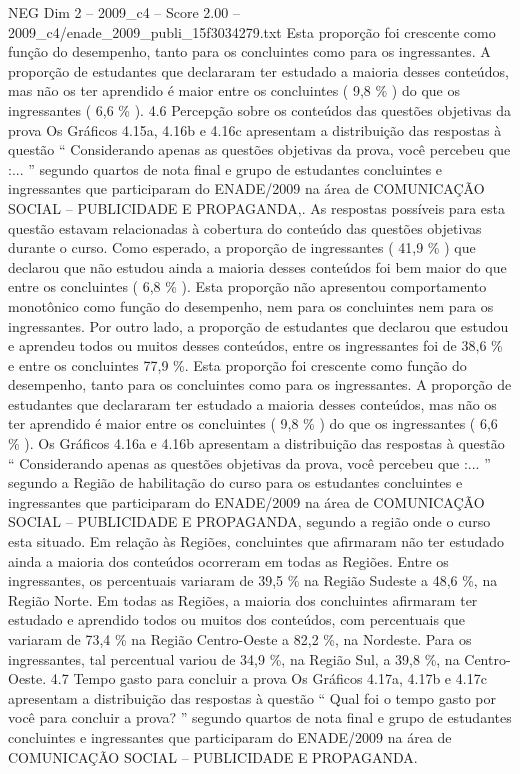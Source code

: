 \begin{textsample}{NEG Dim 2 – 2009\_c4 – Score 2.00 – 2009\_c4/enade\_2009\_publi\_15f3034279.txt}
Esta proporção foi crescente como função do desempenho, tanto para os concluintes como para os ingressantes.
A proporção de estudantes que declararam ter estudado a maioria desses conteúdos, mas não os ter aprendido é maior entre os concluintes ( 9,8 \% ) do que os ingressantes ( 6,6 \% ). 4.6 Percepção sobre os conteúdos das questões objetivas da prova Os Gráficos 4.15a, 4.16b e 4.16c apresentam a distribuição das respostas à questão “ Considerando apenas as questões objetivas da prova, você percebeu que :... ” segundo quartos de nota final e grupo de estudantes concluintes e ingressantes que participaram do ENADE/2009 na área de COMUNICAÇÃO SOCIAL – PUBLICIDADE E PROPAGANDA,.
As respostas possíveis para esta questão estavam relacionadas à cobertura do conteúdo das questões objetivas durante o curso.
Como esperado, a proporção de ingressantes ( 41,9 \% ) que declarou que não estudou ainda a maioria desses conteúdos foi bem maior do que entre os concluintes ( 6,8 \% ).
Esta proporção não apresentou comportamento monotônico como função do desempenho, nem para os concluintes nem para os ingressantes.
Por outro lado, a proporção de estudantes que declarou que estudou e aprendeu todos ou muitos desses conteúdos, entre os ingressantes foi de 38,6 \% e entre os concluintes 77,9 \%.
Esta proporção foi crescente como função do desempenho, tanto para os concluintes como para os ingressantes.
A proporção de estudantes que declararam ter estudado a maioria desses conteúdos, mas não os ter aprendido é maior entre os concluintes ( 9,8 \% ) do que os ingressantes ( 6,6 \% ).
Os Gráficos 4.16a e 4.16b apresentam a distribuição das respostas à questão “ Considerando apenas as questões objetivas da prova, você percebeu que :... ” segundo a Região de habilitação do curso para os estudantes concluintes e ingressantes que participaram do ENADE/2009 na área de COMUNICAÇÃO SOCIAL – PUBLICIDADE E PROPAGANDA, segundo a região onde o curso esta situado.
Em relação às Regiões, concluintes que afirmaram não ter estudado ainda a maioria dos conteúdos ocorreram em todas as Regiões.
Entre os ingressantes, os percentuais variaram de 39,5 \% na Região Sudeste a 48,6 \%, na Região Norte.
Em todas as Regiões, a maioria dos concluintes afirmaram ter estudado e aprendido todos ou muitos dos conteúdos, com percentuais que variaram de 73,4 \% na Região Centro-Oeste a 82,2 \%, na Nordeste.
Para os ingressantes, tal percentual variou de 34,9 \%, na Região Sul, a 39,8 \%, na Centro-Oeste. 4.7 Tempo gasto para concluir a prova Os Gráficos 4.17a, 4.17b e 4.17c apresentam a distribuição das respostas à questão “ Qual foi o tempo gasto por você para concluir a prova? ” segundo quartos de nota final e grupo de estudantes concluintes e ingressantes que participaram do ENADE/2009 na área de COMUNICAÇÃO SOCIAL – PUBLICIDADE E PROPAGANDA.

\end{textsample}

